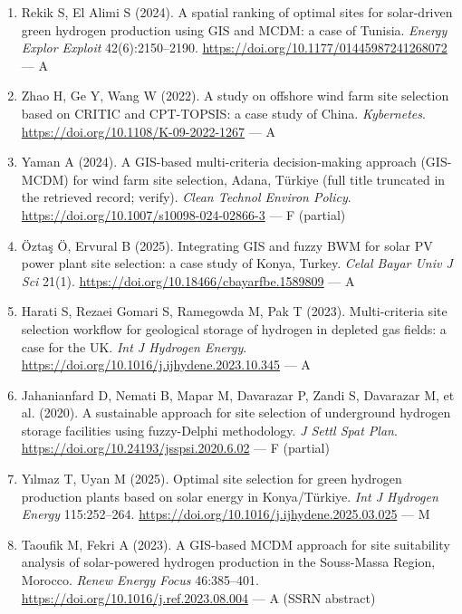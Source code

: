 \documentclass[11pt,a4paper]{article}
\begin{document}
\begin{enumerate}
  \item Rekik S, El Alimi S (2024). A spatial ranking of optimal sites for solar-driven green hydrogen production using GIS and MCDM: a case of Tunisia. \textit{Energy Explor Exploit} 42(6):2150--2190. \url{https://doi.org/10.1177/01445987241268072} --- A

  \item Zhao H, Ge Y, Wang W (2022). A study on offshore wind farm site selection based on CRITIC and CPT-TOPSIS: a case study of China. \textit{Kybernetes}. \url{https://doi.org/10.1108/K-09-2022-1267} --- A

  \item Yaman A (2024). A GIS-based multi-criteria decision-making approach (GIS-MCDM) for wind farm site selection, Adana, Türkiye (full title truncated in the retrieved record; verify). \textit{Clean Technol Environ Policy}. \url{https://doi.org/10.1007/s10098-024-02866-3} --- F (partial)

  \item Öztaş Ö, Ervural B (2025). Integrating GIS and fuzzy BWM for solar PV power plant site selection: a case study of Konya, Turkey. \textit{Celal Bayar Univ J Sci} 21(1). \url{https://doi.org/10.18466/cbayarfbe.1589809} --- A

  \item Harati S, Rezaei Gomari S, Ramegowda M, Pak T (2023). Multi-criteria site selection workflow for geological storage of hydrogen in depleted gas fields: a case for the UK. \textit{Int J Hydrogen Energy}. \url{https://doi.org/10.1016/j.ijhydene.2023.10.345} --- A

  \item Jahanianfard D, Nemati B, Mapar M, Davarazar P, Zandi S, Davarazar M, et al. (2020). A sustainable approach for site selection of underground hydrogen storage facilities using fuzzy-Delphi methodology. \textit{J Settl Spat Plan}. \url{https://doi.org/10.24193/jsspsi.2020.6.02} --- F (partial)

  \item Yılmaz T, Uyan M (2025). Optimal site selection for green hydrogen production plants based on solar energy in Konya/Türkiye. \textit{Int J Hydrogen Energy} 115:252--264. \url{https://doi.org/10.1016/j.ijhydene.2025.03.025} --- M

  \item Taoufik M, Fekri A (2023). A GIS-based MCDM approach for site suitability analysis of solar-powered hydrogen production in the Souss-Massa Region, Morocco. \textit{Renew Energy Focus} 46:385--401. \url{https://doi.org/10.1016/j.ref.2023.08.004} --- A (SSRN abstract)


\end{enumerate}
\end{document}
